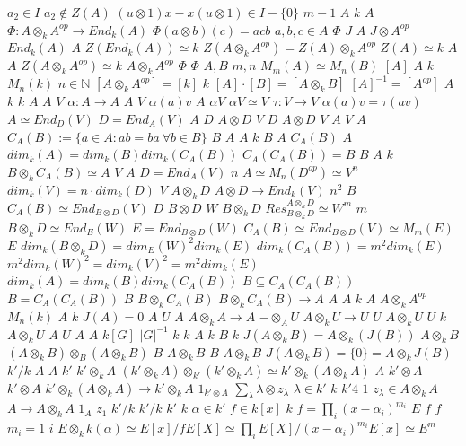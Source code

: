 \documentclass{article}
\begin{document}
$a_2 \in I$
$a_2 \not \in Z(A)$
$(u \otimes 1)x-x(u \otimes 1) \in I-\{0\}$
$m-1$
$A$
$k$
$A$
$\Phi:A \otimes_k A^{op} \rightarrow End_k(A)$
$\Phi(a \otimes b)(c)=acb$
$a,b,c \in A$
$\Phi$
$J$
$A$
$J \otimes A^{op}$
$End_k(A)$
$A$
$Z(End_k(A)) \simeq k$
$Z(A \otimes_k A^{op})=Z(A) \otimes_kA^{op}$
$Z(A) \simeq k$
$A$
$A$
$Z(A \otimes_k A^{op}) \simeq k$
$A \otimes_k A^{op}$
$\Phi$
$\Phi$
$A,B$
$m,n$
$M_m(A) \simeq M_n(B)$
$[A]$
$A$
$k$
$M_n(k)$
$n \in \mathbb{N}$
$[A \otimes_k A^{op}]=[k]$
$k$
$[A] \cdot [B]=[A \otimes_k B]$
$[A]^{-1}=[A^{op}]$
$A$
$k$
$k$
$A$
$A$
$V$
$\alpha:A \rightarrow A$
$A$
$V$
$\alpha(a)v$
$A$
$\alpha V$
$\alpha V \simeq V$
$\tau:V \rightarrow V$
$\alpha(a)v=\tau(av)$
$A \simeq End_{D}(V)$
$D=End_A(V)$
$A$
$D$
$A \otimes D$
$V$
$D$
$A \otimes D$
$V$
$A$
$V$
$A$
$C_A(B):=\{a \in A:ab=ba\ \forall b \in B\}$
$B$
$A$
$A$
$k$
$B$
$A$
$C_A(B)$
$A$
$dim_k(A)=dim_k(B)dim_k(C_A(B))$
$C_A(C_A(B))=B$
$B$
$A$
$k$
$B \otimes_k C_A(B) \simeq A$
$V$
$A$
$D=End_A(V)$
$n$
$A\simeq M_n(D^{op})\simeq V^n$
$dim_k(V)=n\cdot dim_k(D)$
$V$
$A \otimes_k D$
$A \otimes D \rightarrow End_k(V)$
$n^2$
$B$
$C_A(B) \simeq End_{B \otimes D}(V)$
$D$
$B \otimes D$
$W$
$B \otimes_k D$
$Res_{B \otimes_k D}^{A \otimes_k D} \simeq W^m$
$m$
$B \otimes_kD \simeq End_E(W)$
$E=End_{B \otimes D}(W)$
$C_A(B) \simeq End_{B \otimes D}(V) \simeq M_m(E)$
$E$
$dim_k(B \otimes_k D)=dim_E(W)^2dim_k(E)$
$dim_k(C_A(B))=m^2 dim_k(E)$
$m^2 dim_k(W)^2=dim_k(V)^2=m^2dim_k(E)$
$dim_k(A)=dim_k(B)dim_k(C_A(B))$
$B \subseteq C_A(C_A(B))$
$B=C_A(C_A(B))$
$B$
$B \otimes_k C_A(B)$
$B \otimes_k C_A(B) \rightarrow A$
$A$
$A$
$k$
$A$
$A \otimes_k A^{op}$
$M_n(k)$
$A$
$k$
$J(A)={0}$
$A$
$U$
$A$
$A \otimes_k A \rightarrow A$
$- \otimes_A U$
$A \otimes_k U \rightarrow U$
$U$
$A \otimes_k U$
$U$
$k$
$A \otimes_k U$
$A$
$U$
$A$
$A$
$k[G]$
$|G|^{-1}$
$k$
$k$
$A$
$k$
$B$
$k$
$J(A \otimes_k B) =A \otimes_k(J(B))$
$A \otimes_k B$
$(A \otimes_k B) \otimes_B (A \otimes_k B)$
$B$
$A \otimes_k B$
$B$
$A \otimes_k B$
$J(A \otimes_k B)=\{0\}=A \otimes_k J(B)$
$k'/k$
$A$
$A$
$k'$
$k' \otimes_k A$
$(k' \otimes_k A) \otimes_{k'} (k' \otimes_k A) \simeq k' \otimes_k (A \otimes_k A)$
$A$
$k' \otimes A$
$k' \otimes A$
$k' \otimes_k (A \otimes_k A) \rightarrow k' \otimes_k A$
$1_{k' \otimes A}$
$\sum_\lambda \lambda \otimes z_{\lambda}$
$\lambda \in k'$
$k$
$k'4$
$1$
$z_\lambda \in A \otimes_k A$
$A \rightarrow A \otimes_k A$
$1_A$
$z_1$
$k'/k$
$k'/k$
$k'$
$k$
$\alpha \in k'$
$f \in k[x]$
$k$
$f=\prod_i(x-\alpha_i)^{m_i}$
$E$
$f$
$f$
$m_i=1$
$i$
$E \otimes_k k(\alpha) \simeq E[x]/fE[X] \simeq \prod_iE[X]/(x-\alpha_i)^{m_i}E[x] \simeq E^m$
\end{document}
